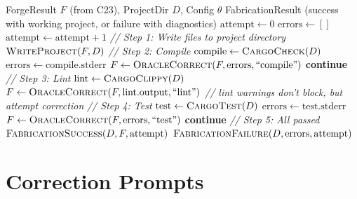\documentclass[11pt,a4paper,twoside]{article}
\theoremstyle{definition}
\theoremstyle{plain}
\theoremstyle{remark}
\begin{document}
\begin{algorithm}[H]
\caption{\textsc{Foundry\_Fabricate}: Closed-loop fabrication}
\label{alg:foundry}
\begin{algorithmic}[1]
\REQUIRE ForgeResult $F$ (from C23), ProjectDir $D$, Config $\theta$
\ENSURE FabricationResult (success with working project, or failure with diagnostics)
\STATE $\mathrm{attempt} \gets 0$
\STATE $\mathrm{errors} \gets []$
\REPEAT
  \STATE $\mathrm{attempt} \gets \mathrm{attempt} + 1$
  \STATE \textit{// Step 1: Write files to project directory}
  \STATE $\textsc{WriteProject}(F, D)$
  \STATE \textit{// Step 2: Compile}
  \STATE $\mathrm{compile} \gets \textsc{CargoCheck}(D)$
    \STATE $\mathrm{errors} \gets \mathrm{compile.stderr}$
    \STATE $F \gets \textsc{OracleCorrect}(F, \mathrm{errors}, \text{``compile''})$
    \STATE \textbf{continue}
  \ENDIF
  \STATE \textit{// Step 3: Lint}
  \STATE $\mathrm{lint} \gets \textsc{CargoClippy}(D)$
    \STATE $F \gets \textsc{OracleCorrect}(F, \mathrm{lint.output}, \text{``lint''})$
    \STATE \textit{// lint warnings don't block, but attempt correction}
  \ENDIF
  \STATE \textit{// Step 4: Test}
  \STATE $\mathrm{test} \gets \textsc{CargoTest}(D)$
    \STATE $\mathrm{errors} \gets \mathrm{test.stderr}$
    \STATE $F \gets \textsc{OracleCorrect}(F, \mathrm{errors}, \text{``test''})$
    \STATE \textbf{continue}
  \ENDIF
  \STATE \textit{// Step 5: All passed}
  \RETURN $\textsc{FabricationSuccess}(D, F, \mathrm{attempt})$
\RETURN $\textsc{FabricationFailure}(D, \mathrm{errors}, \mathrm{attempt})$
\end{algorithmic}
\end{algorithm}


\section{Correction Prompts}\label{sec:correction}
\end{document}
